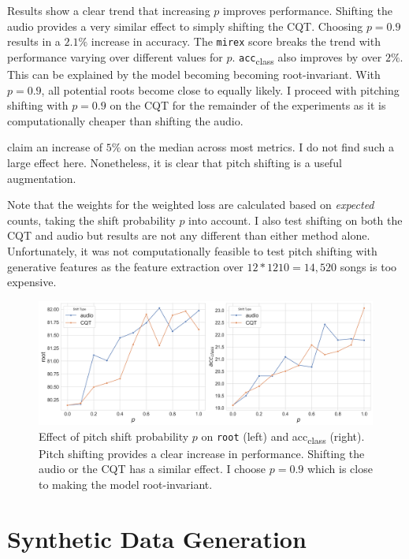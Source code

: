 Results show a clear trend that increasing $p$ improves performance. Shifting the audio provides a very similar effect to simply shifting the CQT. Choosing $p=0.9$ results in a $2.1\%$ increase in accuracy. The \texttt{mirex} score breaks the trend with performance varying over different values for $p$. \texttt{acc}\textsubscript{class} also improves by over $2\%$. This can be explained by the model becoming becoming root-invariant. With $p=0.9$, all potential roots become close to equally likely. I proceed with pitching shifting with $p=0.9$ on the CQT for the remainder of the experiments as it is computationally cheaper than shifting the audio.

\citet{StructuredTraining} claim an increase of $5\%$ on the median across most metrics. I do not find such a large effect here. Nonetheless, it is clear that pitch shifting is a useful augmentation.

Note that the weights for the weighted loss are calculated based on \emph{expected} counts, taking the shift probability $p$ into account. I also test shifting on both the CQT and audio but results are not any different than either method alone. Unfortunately, it was not computationally feasible to test pitch shifting with generative features as the feature extraction over $12 * 1210 = 14,520$ songs is too expensive.

\begin{figure}[H]
    \centering
    \includegraphics[width=1.0\textwidth]{figures/pitch_shift_analysis.png}
    \caption{Effect of pitch shift probability $p$ on \texttt{root} (left) and acc\textsubscript{class} (right). Pitch shifting provides a clear increase in performance. Shifting the audio or the CQT has a similar effect. I choose $p=0.9$ which is close to making the model root-invariant.}\label{fig:pitch_augmentation}
\end{figure}


\section{Synthetic Data Generation}\label{sec:synthetic_data}

